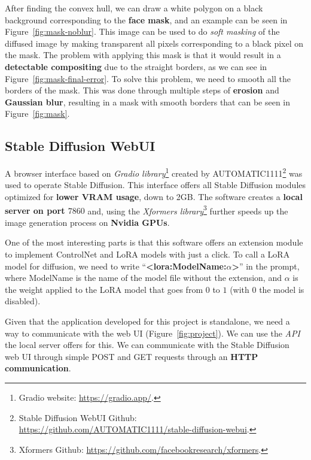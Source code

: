 \documentclass[preprint]{elsarticle}
\begin{document}
After finding the convex hull, we can draw a white polygon on a black background corresponding to the \textbf{face mask},  and an example can be seen in Figure~\ref{fig:mask-noblur}. 
This image can be used to do \emph{soft masking} of the diffused image by making transparent all  pixels corresponding to a black pixel on the mask.  The problem with applying this mask is that it would result in a \textbf{detectable compositing} due to the straight borders, 
as we can see in Figure~\ref{fig:mask-final-error}.  To solve this problem, we need to smooth all the borders of the mask.  This was done through multiple steps of \textbf{erosion} and \textbf{Gaussian blur}, 
resulting in a mask with smooth borders that can be seen in Figure~\ref{fig:mask}.



\subsection{Stable Diffusion WebUI} \label{sec:stable_diffusion_webui}

A browser interface based on \emph{Gradio library}\footnote{Gradio website: \url{https://gradio.app/}.} 
created by AUTOMATIC1111\footnote{Stable Diffusion WebUI Github: \url{https://github.com/AUTOMATIC1111/stable-diffusion-webui}.} 
was used to operate Stable Diffusion. 
This interface offers all Stable Diffusion modules optimized for \textbf{lower VRAM usage}, down to 2GB. 
The software creates a \textbf{local server on port $7860$} and,  using the \emph{Xformers library}\footnote{Xformers Github: \url{https://github.com/facebookresearch/xformers}.} further speeds up the image generation process on \textbf{Nvidia GPUs}.

One of the most interesting parts is that this software offers an extension module to  implement ControlNet and LoRA models with just a click.  To call a LoRA model for diffusion, we need to write ``\textbf{<lora:ModelName:$\alpha$>}'' in the prompt,
where ModelName is the name of the model file without the extension,  and $\alpha$ is the weight applied to the LoRA model that goes from $0$ to $1$ (with $0$ the model is disabled). 

Given that the application developed for this project is standalone,  we need a way to communicate with the web UI (Figure~\ref{fig:project}). We can use the \emph{API} the local server offers for this.
We can communicate with the Stable Diffusion web UI through simple 
POST and GET requests through an \textbf{HTTP communication}. 
\end{document}

